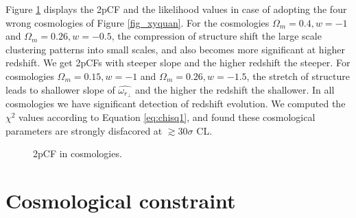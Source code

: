 \documentclass[iop]{emulateapj}
\begin{document}


Figure \ref{fig_cosmo} displays the 2pCF and the likelihood values in case of adopting 
the four wrong cosmologies of Figure \ref{fig_xyquan}.
For the cosmologies $\Omega_m=0.4,w=-1$ and $\Omega_m=0.26,w=-0.5$,
the compression of structure shift the large scale clustering patterns into small scales,
and also becomes more significant at higher redshift.
We get 2pCFs with steeper slope and the higher redshift the steeper.
For cosmologies $\Omega_m=0.15,w=-1$ and $\Omega_m=0.26,w=-1.5$,
the stretch of structure leads to shallower slope of $\hat{\omega_{r_\perp}}$ and the higher the redshift the shallower.
In all cosmologies we have significant detection of redshift evolution.
We computed the $\chi^2$ values according to Equation \ref{eq:chisq1}, 
and found these cosmological parameters are strongly disfacored 
at $\gtrsim30\sigma$ CL.


\begin{figure}
   \caption{\label{fig_cosmo}
   2pCF in cosmologies.
   }
\end{figure}



\section{Cosmological constraint}
\end{document}
